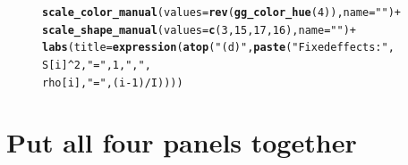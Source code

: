 \documentclass{article}\usepackage[]{graphicx}\usepackage[]{color}
\makeatletter
\newcommand{\hlnum}[1]{\textcolor[rgb]{0.686,0.059,0.569}{#1}}%
\newcommand{\hlstr}[1]{\textcolor[rgb]{0.192,0.494,0.8}{#1}}%
\newcommand{\hlopt}[1]{\textcolor[rgb]{0,0,0}{#1}}%
\newcommand{\hlstd}[1]{\textcolor[rgb]{0.345,0.345,0.345}{#1}}%
\newcommand{\hlkwc}[1]{\textcolor[rgb]{0.333,0.667,0.333}{#1}}%
\newcommand{\hlkwd}[1]{\textcolor[rgb]{0.737,0.353,0.396}{\textbf{#1}}}%
\newenvironment{kframe}{%
 \def\at@end@of@kframe{}%
 \ifinner\ifhmode%
  \def\at@end@of@kframe{\end{minipage}}%
  \begin{minipage}{\columnwidth}%
 \fi\fi%
 \def\FrameCommand##1{\hskip\@totalleftmargin \hskip-\fboxsep
 \colorbox{shadecolor}{##1}\hskip-\fboxsep
     \hskip-\linewidth \hskip-\@totalleftmargin \hskip\columnwidth}%
 \MakeFramed {\advance\hsize-\width
   \@totalleftmargin\z@ \linewidth\hsize
   \@setminipage}}%
 {\par\unskip\endMakeFramed%
 \at@end@of@kframe}
\newenvironment{knitrout}{}{} %
\makeatother
\begin{document}
\begin{figure}[h]
\begin{knitrout}
\begin{kframe}
\begin{alltt}
  \hlkwd{scale_color_manual}\hlstd{(}\hlkwc{values}\hlstd{=}\hlkwd{rev}\hlstd{(}\hlkwd{gg_color_hue}\hlstd{(}\hlnum{4}\hlstd{)),} \hlkwc{name}\hlstd{=}\hlstr{""}\hlstd{)}\hlopt{+}
  \hlkwd{scale_shape_manual}\hlstd{(}\hlkwc{values}\hlstd{=}\hlkwd{c}\hlstd{(}\hlnum{3}\hlstd{,}\hlnum{15}\hlstd{,}\hlnum{17}\hlstd{,}\hlnum{16}\hlstd{),}\hlkwc{name}\hlstd{=}\hlstr{""}\hlstd{)}\hlopt{+}
  \hlkwd{labs}\hlstd{(}\hlkwc{title}\hlstd{=}\hlkwd{expression}\hlstd{(}\hlkwd{atop}\hlstd{(}\hlstr{"(d)"}\hlstd{,} \hlkwd{paste}\hlstd{(}\hlstr{"Fixed effects: "}\hlstd{,}
                                          \hlstd{S[i]}\hlopt{^}\hlnum{2}\hlstd{,} \hlstr{" = "}\hlstd{,} \hlnum{1}\hlstd{,} \hlstr{", "}\hlstd{,}
                                          \hlstd{rho[i],} \hlstr{" = "}\hlstd{, (i}\hlopt{-}\hlnum{1}\hlstd{)}\hlopt{/}\hlstd{I))))}
\end{alltt}


{\ttfamily\noindent\itshape\color{messagecolor}{\#\# Scale for 'y' is already present. Adding another scale\\\#\# for 'y', which will replace the existing scale.}}\end{kframe}
\end{knitrout}
\end{figure}

\section{Put all four panels together}
\end{document}
